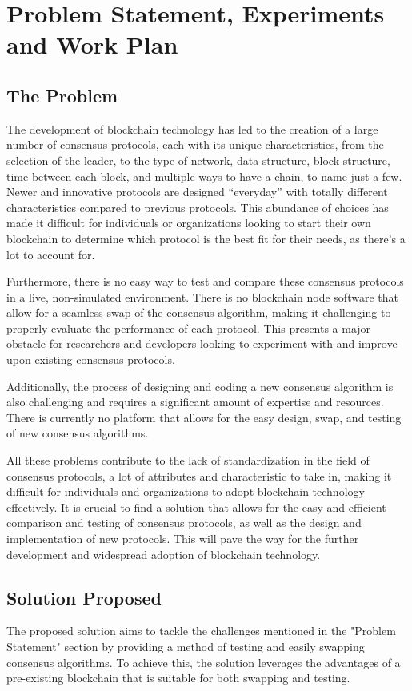 \chapter{Problem Statement, Experiments and Work Plan}

\section{The Problem}
The development of blockchain technology has led to the creation of a large number of consensus protocols, each with its unique characteristics, from the selection of the leader, to the type of network, data structure, block structure, time between each block, and multiple ways to have a chain, to name just a few. Newer and innovative protocols are designed ``everyday'' with totally different characteristics compared to previous protocols.
This abundance of choices has made it difficult for individuals or organizations looking to start their own blockchain to determine which protocol is the best fit for their needs, as there's a lot to account for.

Furthermore, there is no easy way to test and compare these consensus protocols in a live, non-simulated environment.
There is no blockchain node software that allow for a seamless swap of the consensus algorithm, making it challenging to properly evaluate the performance of each protocol. This presents a major obstacle for researchers and developers looking to experiment with and improve upon existing consensus protocols.

Additionally, the process of designing and coding a new consensus algorithm is also challenging and requires a significant amount of expertise and resources. There is currently no platform that allows for the easy design, swap, and testing of new consensus algorithms.

All these problems contribute to the lack of standardization in the field of consensus protocols, a lot of attributes and characteristic to take in, making it difficult for individuals and organizations to adopt blockchain technology effectively.
It is crucial to find a solution that allows for the easy and efficient comparison and testing of consensus protocols, as well as the design and implementation of new protocols. This will pave the way for the further development and widespread adoption of blockchain technology.


\section{Solution Proposed}
The proposed solution aims to tackle the challenges mentioned in the "Problem Statement" section by providing a method of testing and easily swapping consensus algorithms. To achieve this, the solution leverages the advantages of a pre-existing blockchain that is suitable for both swapping and testing.


